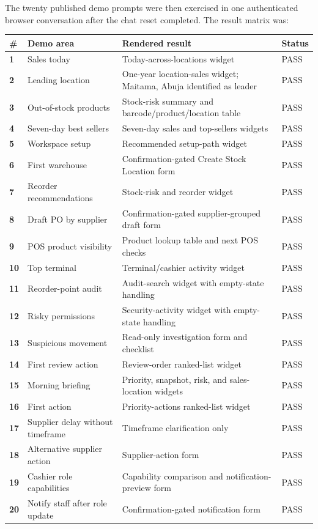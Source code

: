 \documentclass[10pt]{article}
\begin{document}
The twenty published demo prompts were then exercised in one authenticated browser conversation after the chat reset completed. The result matrix was:
\begin{center}
\small
\begin{tabularx}{\textwidth}{>{\bfseries}p{} X X p{}}
\# & Demo area & Rendered result & Status \\
\hline
1 & Sales today & Today-across-locations widget & PASS \\
2 & Leading location & One-year location-sales widget; Maitama, Abuja identified as leader & PASS \\
3 & Out-of-stock products & Stock-risk summary and barcode/product/location table & PASS \\
4 & Seven-day best sellers & Seven-day sales and top-sellers widgets & PASS \\
5 & Workspace setup & Recommended setup-path widget & PASS \\
6 & First warehouse & Confirmation-gated Create Stock Location form & PASS \\
7 & Reorder recommendations & Stock-risk and reorder widget & PASS \\
8 & Draft PO by supplier & Confirmation-gated supplier-grouped draft form & PASS \\
9 & POS product visibility & Product lookup table and next POS checks & PASS \\
10 & Top terminal & Terminal/cashier activity widget & PASS \\
11 & Reorder-point audit & Audit-search widget with empty-state handling & PASS \\
12 & Risky permissions & Security-activity widget with empty-state handling & PASS \\
13 & Suspicious movement & Read-only investigation form and checklist & PASS \\
14 & First review action & Review-order ranked-list widget & PASS \\
15 & Morning briefing & Priority, snapshot, risk, and sales-location widgets & PASS \\
16 & First action & Priority-actions ranked-list widget & PASS \\
17 & Supplier delay without timeframe & Timeframe clarification only & PASS \\
18 & Alternative supplier action & Supplier-action form & PASS \\
19 & Cashier role capabilities & Capability comparison and notification-preview form & PASS \\
20 & Notify staff after role update & Confirmation-gated notification form & PASS \\
\end{tabularx}
\end{center}
\end{document}
